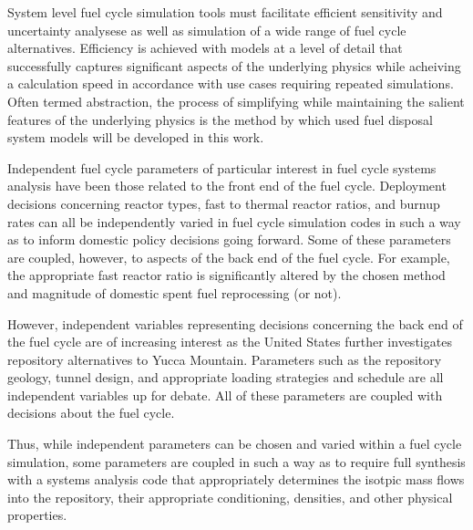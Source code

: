 
System level fuel cycle simulation tools must facilitate efficient sensitivity 
and uncertainty analysese as well as simulation of a wide range of fuel cycle 
alternatives.  Efficiency is achieved with models at a level of detail that 
successfully captures significant aspects of the underlying physics while 
acheiving a calculation speed in accordance with use cases requiring repeated 
simulations. Often termed abstraction, the process of simplifying while 
maintaining the salient features of the underlying physics is the method by 
which used fuel disposal system models will be developed in this work. 


Independent fuel cycle parameters of particular interest in fuel cycle systems 
analysis have been those related to the front end of the fuel cycle. Deployment 
decisions concerning reactor types, fast to thermal reactor ratios, and burnup 
rates can all be independently varied in fuel cycle simulation codes in such a 
way as to inform domestic policy decisions going forward. Some of these 
parameters are coupled, however, to aspects of the back end of the fuel cycle.  
For example, the appropriate fast reactor ratio is significantly altered by the 
chosen method and magnitude of domestic spent fuel reprocessing (or not).


However, independent variables representing decisions concerning the back end
of the fuel cycle are of increasing interest as the United States further
investigates repository alternatives to Yucca Mountain.  Parameters such as the
repository geology, tunnel design, and appropriate loading strategies and
schedule are all independent variables up for debate. All of these
parameters are coupled with decisions about the fuel cycle. 


Thus, while independent parameters can be chosen and varied
within a fuel cycle simulation, some parameters are coupled in such a way as to
require full synthesis with a systems analysis code that appropriately
determines the isotpic mass flows into the repository, their appropriate
conditioning, densities, and other physical properties.  

